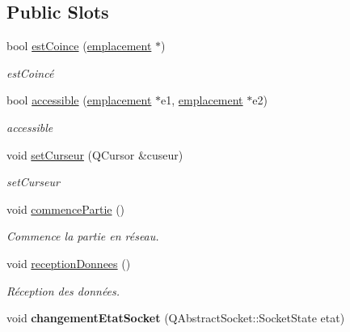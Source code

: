 \subsection*{Public Slots}
\begin{DoxyCompactItemize}
\item 
\hypertarget{class_main_window_a4ae4ac96dbfdcb80facbf7da0ae3fb5e}{bool \hyperlink{class_main_window_a4ae4ac96dbfdcb80facbf7da0ae3fb5e}{est\-Coince} (\hyperlink{classemplacement}{emplacement} $\ast$)}\label{class_main_window_a4ae4ac96dbfdcb80facbf7da0ae3fb5e}

\begin{DoxyCompactList}\small\item\em est\-Coincé \end{DoxyCompactList}\item 
bool \hyperlink{class_main_window_ac3a2c00ad936408dce78d15697eeef24}{accessible} (\hyperlink{classemplacement}{emplacement} $\ast$e1, \hyperlink{classemplacement}{emplacement} $\ast$e2)
\begin{DoxyCompactList}\small\item\em accessible \end{DoxyCompactList}\item 
void \hyperlink{class_main_window_a8e9fb499b85eef1d31b4caedcdad3424}{set\-Curseur} (Q\-Cursor \&cuseur)
\begin{DoxyCompactList}\small\item\em set\-Curseur \end{DoxyCompactList}\item 
void \hyperlink{class_main_window_aa423b534c9d408e59a52f6e7644ccdcb}{commence\-Partie} ()
\begin{DoxyCompactList}\small\item\em Commence la partie en réseau. \end{DoxyCompactList}\item 
void \hyperlink{class_main_window_acb2efdb6b0b137cf2e44d6bd2fbb3aec}{reception\-Donnees} ()
\begin{DoxyCompactList}\small\item\em Réception des données. \end{DoxyCompactList}\item 
\hypertarget{class_main_window_a52d0b54e86461bd0f4738921651c15a2}{void {\bfseries changement\-Etat\-Socket} (Q\-Abstract\-Socket\-::\-Socket\-State etat)}\label{class_main_window_a52d0b54e86461bd0f4738921651c15a2}

\end{DoxyCompactItemize}
